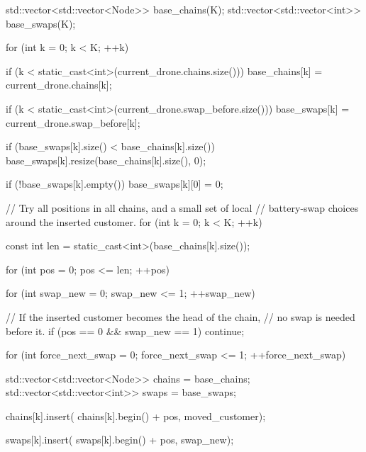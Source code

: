 {{{{                std::vector<std::vector<Node>> base_chains(K);
                std::vector<std::vector<int>> base_swaps(K);

                for (int k = 0; k < K; ++k)
                {
                    if (k < static_cast<int>(current_drone.chains.size()))
                    {
                        base_chains[k] = current_drone.chains[k];
                    }

                    if (k < static_cast<int>(current_drone.swap_before.size()))
                    {
                        base_swaps[k] = current_drone.swap_before[k];
                    }

                    if (base_swaps[k].size() < base_chains[k].size())
                    {
                        base_swaps[k].resize(base_chains[k].size(), 0);
                    }

                    if (!base_swaps[k].empty())
                    {
                        base_swaps[k][0] = 0;
                    }
                }

                // Try all positions in all chains, and a small set of local
                // battery-swap choices around the inserted customer.
                for (int k = 0; k < K; ++k)
                {
                    const int len = static_cast<int>(base_chains[k].size());

                    for (int pos = 0; pos <= len; ++pos)
                    {
                        for (int swap_new = 0; swap_new <= 1; ++swap_new)
                        {
                            // If the inserted customer becomes the head of the chain,
                            // no swap is needed before it.
                            if (pos == 0 && swap_new == 1)
                            {
                                continue;
                            }

                            for (int force_next_swap = 0; force_next_swap <= 1; ++force_next_swap)
                            {
                                std::vector<std::vector<Node>> chains = base_chains;
                                std::vector<std::vector<int>> swaps = base_swaps;

                                chains[k].insert(
                                    chains[k].begin() + pos,
                                    moved_customer);

                                swaps[k].insert(
                                    swaps[k].begin() + pos,
                                    swap_new);

}}}}}}}}
